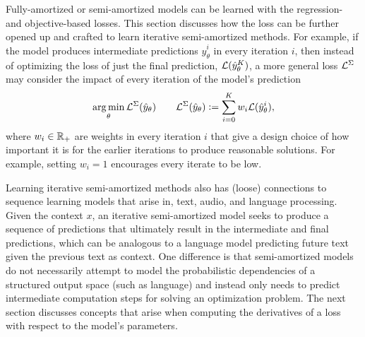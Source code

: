 Fully-amortized or semi-amortized models can be learned
with the regression- and objective-based losses.
This section discusses how the loss can be further opened up
and crafted to learn iterative semi-amortized methods.
For example, if the model produces intermediate predictions
$\hat y_\theta^i$ in every iteration $i$, then instead of
optimizing the loss of just the final prediction,
\ie ${\mathcal{L}}(\hat y_\theta^K)$, a more general loss
${\mathcal{L}}^\Sigma$ may consider the impact of every iteration
of the model's prediction
\begin{equation}
  \operatorname*{arg\,min}_\theta {\mathcal{L}}^\Sigma(\hat y_\theta) \qquad {\mathcal{L}}^\Sigma(\hat y_\theta) \vcentcolon= \sum_{i=0}^K w_i {\mathcal{L}}(\hat y_\theta^i),
\label{eq:iter-loss}
\end{equation}
where $w_i\in\mathbb{R}_+$ are weights in every iteration $i$
that give a design choice of how important
it is for the earlier iterations to produce reasonable
solutions.
For example, setting $w_i=1$ encourages every iterate
to be low.

Learning iterative semi-amortized methods also has (loose)
connections to sequence learning models that arise in,
\eg text, audio, and language processing.
Given the context $x$, an iterative semi-amortized model
seeks to produce a sequence of predictions that ultimately
result in the intermediate and final predictions,
which can be analogous to a language model predicting
future text given the previous text as context.
One difference is that semi-amortized models do not necessarily attempt
to model the probabilistic dependencies of a structured output space
(such as language) and instead only needs to predict
intermediate computation steps for solving an optimization problem.
The next section discusses concepts that arise when computing the derivatives
of a loss with respect to the model's parameters.


